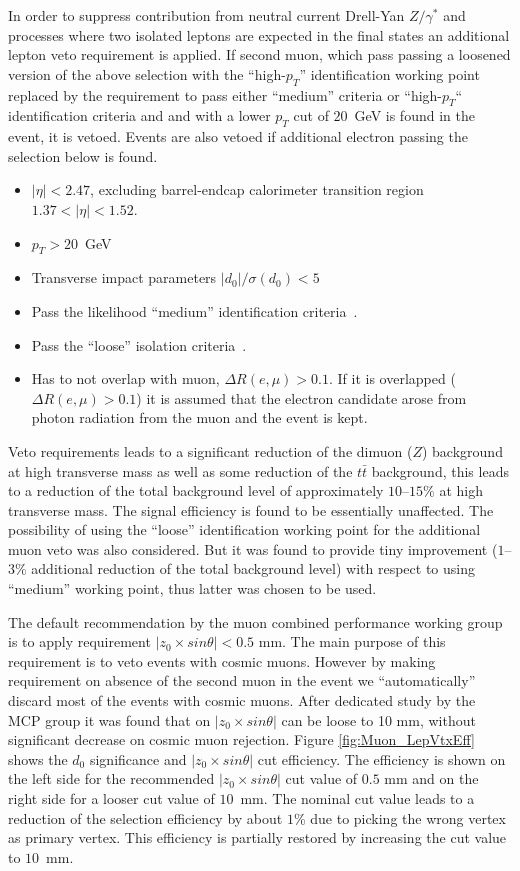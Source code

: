 In order to suppress contribution from neutral current Drell-Yan $Z/\gamma^*$ and \ttbar processes
where two isolated leptons are expected in the final states an additional lepton veto requirement
is applied. If second muon, which pass passing a loosened version of the above selection with the ``high-$p_T$'' identification working point replaced by the requirement to pass either ``medium'' criteria or
``high-$p_T$`` identification criteria and and with a lower $p_T$ cut of $20$~GeV is found in the event, it is vetoed.
Events are also vetoed if additional electron passing the selection below is found.
\begin{itemize}
\item $|\eta| < 2.47$, excluding barrel-endcap calorimeter transition region $1.37 < |\eta| < 1.52$.
\item $p_T > 20$~GeV
\item Transverse impact parameters $|d_0|/\sigma(d_0) < 5$
\item Pass the likelihood ``medium'' identification criteria~\cite{ATL-PHYS-PUB-2015-041}.
\item Pass the ``loose'' isolation criteria~\cite{ATLAS-CONF-2016-024}.
\item Has to not overlap with muon, $\Delta R(e,\mu)>0.1$. If it is overlapped ($\Delta R(e,\mu)>0.1$)
it is assumed that the electron candidate arose from photon radiation from the muon and the event is kept.
\end{itemize}
Veto requirements leads to a significant reduction of the dimuon ($Z$) background
at high transverse mass as well as some reduction of the $t\bar{t}$ background, this leads to a reduction of the total background level of approximately $10$--$15\%$ at high transverse mass. 
The signal efficiency is found to be essentially unaffected.
The possibility of using the ``loose'' identification working point for the additional muon veto was also considered. But it was found to provide tiny improvement ($1$--$3\%$ additional reduction of the total background level) with respect to using ``medium'' working point, thus latter was chosen to be used.

The default recommendation by the muon combined performance working group is to apply requirement $|z_0 \times sin \theta| < 0.5$ mm. The main purpose of this requirement is to veto events with cosmic muons.
However by making requirement on absence of the second muon in the event we ``automatically'' discard most of the events with cosmic muons. After dedicated study by the MCP group it was found that on 
$|z_0 \times sin \theta|$ can be loose to 10 mm, without significant decrease on cosmic muon rejection.
Figure \ref{fig:Muon_LepVtxEff} shows the $d_0$ significance and $|z_0 \times sin \theta|$ cut efficiency. The efficiency is shown on the left side for the recommended $|z_0 \times sin \theta|$ cut value of $0.5$ mm and on the right side for a looser
cut value of $10$~mm. The nominal cut value leads to a reduction of the selection efficiency by about $1$\% due to picking the wrong vertex as primary vertex. This efficiency
is partially restored by increasing the cut value to $10$~mm. 

